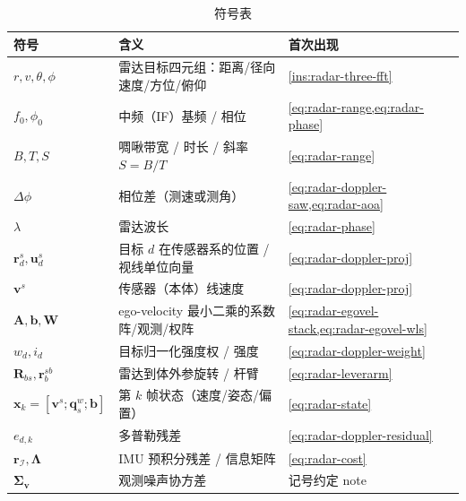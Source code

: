 \begin{table}[H]\centering\small
\caption{符号表}
\begin{tabular}{lll}
\toprule
符号 & 含义 & 首次出现 \\
\midrule
$r,v,\theta,\phi$ & 雷达目标四元组：距离/径向速度/方位/俯仰 & \cref{ins:radar-three-fft} \\
$f_0,\phi_0$ & 中频（IF）基频 / 相位 & \cref{eq:radar-range,eq:radar-phase} \\
$B,T,S$ & 啁啾带宽 / 时长 / 斜率 $S=B/T$ & \cref{eq:radar-range} \\
$\Delta\phi$ & 相位差（测速或测角） & \cref{eq:radar-doppler-saw,eq:radar-aoa} \\
$\lambda$ & 雷达波长 & \cref{eq:radar-phase} \\
$\mathbf r_d^s,\mathbf u_d^s$ & 目标 $d$ 在传感器系的位置 / 视线单位向量 & \cref{eq:radar-doppler-proj} \\
$\mathbf v^s$ & 传感器（本体）线速度 & \cref{eq:radar-doppler-proj} \\
$\mathbf A,\mathbf b,\mathbf W$ & ego-velocity 最小二乘的系数阵/观测/权阵 & \cref{eq:radar-egovel-stack,eq:radar-egovel-wls} \\
$w_d,i_d$ & 目标归一化强度权 / 强度 & \cref{eq:radar-doppler-weight} \\
$\mathbf R_{bs},\mathbf r_b^{sb}$ & 雷达到体外参旋转 / 杆臂 & \cref{eq:radar-leverarm} \\
$\mathbf x_k=[\mathbf v^s;\mathbf q_s^w;\mathbf b]$ & 第 $k$ 帧状态（速度/姿态/偏置） & \cref{eq:radar-state} \\
$e_{d,k}$ & 多普勒残差 & \cref{eq:radar-doppler-residual} \\
$\mathbf r_{\mathcal I},\boldsymbol\Lambda$ & IMU 预积分残差 / 信息矩阵 & \cref{eq:radar-cost} \\
$\boldsymbol\Sigma_{\mathbf v}$ & 观测噪声协方差 & 记号约定 note \\
\bottomrule
\end{tabular}
\end{table}


